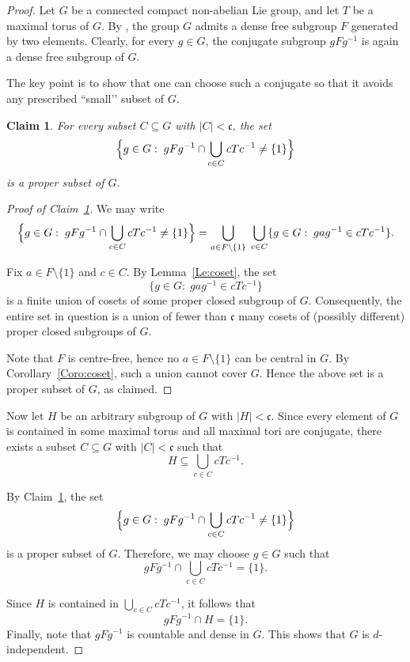 \documentclass[12pt]{amsart}
\newtheorem{claim}{Claim}
\theoremstyle{definition}
\theoremstyle{remark}
\begin{document}
\begin{proof}
	Let $G$ be a connected compact non-abelian Lie group, and let $T$ be a maximal torus of $G$.
	By \cite[Corollary~6.87]{HM}, the group $G$ admits a dense free subgroup $F$ generated by two elements.
	Clearly, for every $g\in G$, the conjugate subgroup $gFg^{-1}$ is again a dense free subgroup of $G$.
	
	The key point is to show that one can choose such a conjugate so that it avoids
	any prescribed “small’’ subset of $G$.
	
	\begin{claim}\label{cl1}
		For every subset $C\subseteq G$ with $|C|<\mathfrak{c}$, the set
		\[
		\Bigl\{g\in G:\; gFg^{-1}\cap \bigcup_{c\in C} cTc^{-1}\neq \{1\}\Bigr\}
		\]
		is a proper subset of $G$.
	\end{claim}
	
	\begin{proof}[Proof of Claim~\ref{cl1}]
		We may write
		\[
		\Bigl\{g\in G:\; gFg^{-1}\cap \bigcup_{c\in C} cTc^{-1}\neq \{1\}\Bigr\}
		=
		\bigcup_{a\in F\setminus\{1\}}\;
		\bigcup_{c\in C}
		\{g\in G:\; gag^{-1}\in cTc^{-1}\}.
		\]
		
		Fix $a\in F\setminus\{1\}$ and $c\in C$.
		By Lemma~\ref{Le:coset}, the set
		\[
		\{g\in G:\; gag^{-1}\in cTc^{-1}\}
		\]
		is a finite union of cosets of some proper closed subgroup of $G$.
		Consequently, the entire set in question is a union of fewer than $\mathfrak{c}$
		many cosets of (possibly different) proper closed subgroups of $G$.
		
		Note that $F$ is centre-free, hence no $a\in F\setminus\{1\}$ can be central in $G$. By Corollary~\ref{Coro:coset}, such a union cannot cover $G$.
		Hence the above set is a proper subset of $G$, as claimed.
	\end{proof}
	
	Now let $H$ be an arbitrary subgroup of $G$ with $|H|<\mathfrak{c}$.
	Since every element of $G$ is contained in some maximal torus and all maximal tori
	are conjugate, there exists a subset $C\subseteq G$ with $|C|<\mathfrak{c}$ such that
	\[
	H\subseteq \bigcup_{c\in C} cTc^{-1}.
	\]
	
	By Claim~\ref{cl1}, the set
	\[
	\Bigl\{g\in G:\; gFg^{-1}\cap \bigcup_{c\in C} cTc^{-1}\neq \{1\}\Bigr\}
	\]
	is a proper subset of $G$.
	Therefore, we may choose $g\in G$ such that
	\[
	gFg^{-1}\cap \bigcup_{c\in C} cTc^{-1}=\{1\}.
	\]
	
	Since $H$ is contained in $\bigcup_{c\in C} cTc^{-1}$, it follows that
	\[
	gFg^{-1}\cap H=\{1\}.
	\]
	Finally, note that $gFg^{-1}$ is countable and dense in $G$.
	This shows that $G$ is $d$-independent.
\end{proof}
\end{document}
